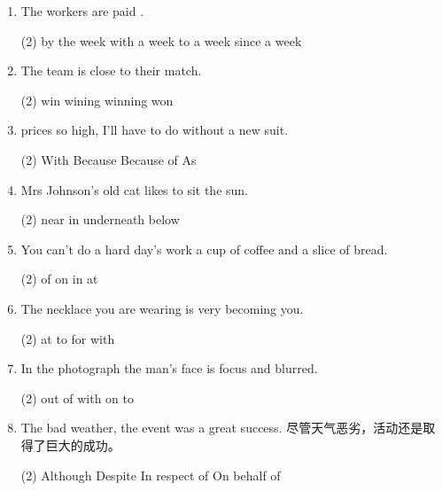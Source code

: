 \begin{enumerate}
\item The workers are paid \ttu.
  \begin{tasks}(2)
    \task by the week
    \task with a week
    \task to a week
    \task since a week
  \end{tasks}

\item The team is close to \ttu their match.
  \begin{tasks}(2)
    \task win
    \task wining
    \task winning
    \task won
  \end{tasks}

\item \ttu prices so high, I'll have to do without a new suit.
  \begin{tasks}(2)
    \task With
    \task Because
    \task Because of
    \task As
  \end{tasks}

\item Mrs Johnson's old cat likes to sit \ttu the sun.
  \begin{tasks}(2)
    \task near
    \task in
    \task underneath
    \task below
  \end{tasks}

\item You can't do a hard day's work \ttu a cup of coffee and a slice of bread.
  \begin{tasks}(2)
    \task of
    \task on
    \task in
    \task at
  \end{tasks}

\item The necklace you are wearing is very becoming \ttu you.
  \begin{tasks}(2)
    \task at
    \task to
    \task for
    \task with
  \end{tasks}

\item In the photograph the man's face is \ttu focus and blurred.
  \begin{tasks}(2)
    \task out of
    \task with
    \task on
    \task to
  \end{tasks}

\item \ttu The bad weather, the event was a great success.
尽管天气恶劣，活动还是取得了巨大的成功。

  \begin{tasks}(2)
    \task Although
    \task Despite
    \task In respect of
    \task On behalf of
  \end{tasks}


\end{enumerate}
